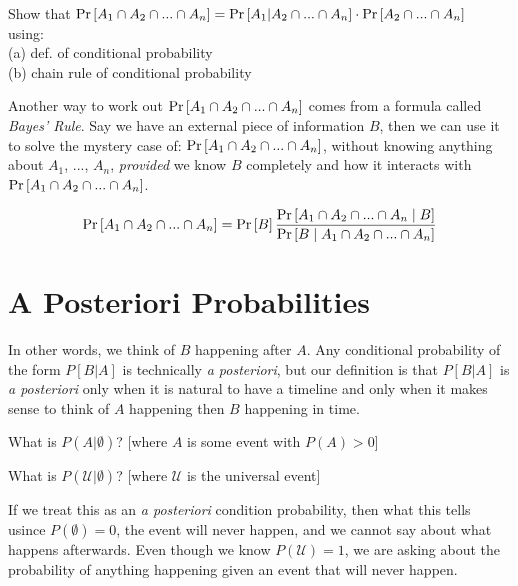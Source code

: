\frmrule

\begin{example}
Show that $\text{Pr}\left[A_1 \cap A_2 \cap ... \cap A_n\right] = \text{Pr}\left[A_1 | A_2 \cap ... \cap A_n\right] \cdot \text{Pr}\left[A_2 \cap ... \cap A_n\right]$
\\using:\\
(a) def. of conditional probability \\
(b) chain rule of conditional probability
\end{example}

\frmrule

Another way to work out $\text{Pr}\left[A_1 \cap A_2 \cap ... \cap A_n\right]$ comes from 
a formula called \textit{Bayes' Rule}. Say we have an external piece of 
information $B$, then we can use it to solve the mystery case of: $\text{Pr}\left[A_1 \cap A_2 \cap ... \cap A_n\right]$, 
without knowing anything about $A_1$, ..., $A_n$,
\textit{provided} we know $B$ completely 
and how it interacts with $\text{Pr}\left[A_1 \cap A_2 \cap ... \cap A_n\right]$. 

$$\text{Pr}\left[A_1 \cap A_2 \cap ... \cap A_n\right] = \text{Pr}\left[B\right]\frac{\text{Pr}\left[A_1 \cap A_2 \cap ... \cap A_n \;|\; B\right]}{\text{Pr}\left[B \;|\; A_1 \cap A_2 \cap ... \cap A_n\right]}$$



\section{A Posteriori Probabilities}


In other words, we think of $B$ happening after $A$. Any conditional probability of 
the form $P[B|A]$ is technically \textit{a posteriori}, but our definition is that 
$P[B|A]$ is \textit{a posteriori} only when it is natural to have a timeline 
and only when it makes sense to think of $A$ happening then $B$ happening in time. 

\begin{example}
What is $P(A|\emptyset)$? [where $A$ is some event with $P(A) > 0$]
\end{example}


\begin{example}
What is $P(\mathcal{U}|\emptyset)$? [where $\mathcal{U}$ is the universal event]
\end{example}



If we treat this as an \textit{a posteriori} condition probability, then 
what this tells usince $P(\emptyset) = 0$, the event will never happen, and we cannot say about 
what happens afterwards. Even though we know $P(\mathcal{U}) = 1$, we are asking 
about the probability of anything happening given an event that will never happen. 

